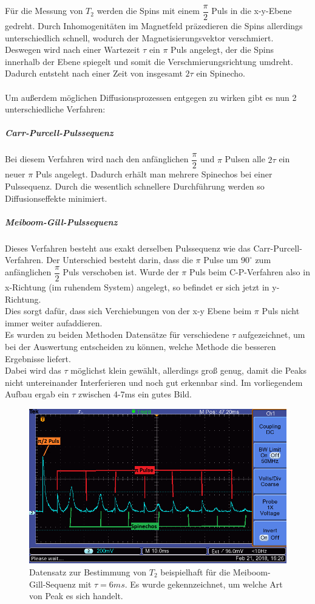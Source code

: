 \documentclass[12pt,a4paper]{article}
\begin{document}
Für die Messung von $T_2$ werden die Spins mit einem  $\dfrac{\pi}{2}$ Puls in die x-y-Ebene gedreht. Durch Inhomogenitäten im Magnetfeld präzedieren die Spins allerdings unterschiedlich schnell, wodurch der Magnetisierungsvektor verschmiert. Deswegen wird nach einer Wartezeit $\tau$ ein $\pi$ Puls angelegt, der die Spins innerhalb der Ebene spiegelt und somit die Verschmierungsrichtung umdreht. Dadurch entsteht nach einer Zeit von insgesamt $2 \tau$ ein Spinecho. \\ 
\\
Um außerdem möglichen Diffusionsprozessen entgegen zu wirken gibt es nun 2 unterschiedliche Verfahren:

\subparagraph{Carr-Purcell-Pulssequenz}
Bei diesem Verfahren wird nach den anfänglichen $\dfrac{\pi}{2}$ und $\pi$ Pulsen alle  $2 \tau$ ein neuer $\pi$ Puls angelegt. Dadurch erhält man mehrere Spinechos bei einer Pulssequenz. Durch die wesentlich schnellere Durchführung werden so Diffusionseffekte minimiert.
\subparagraph{Meiboom-Gill-Pulssequenz}
Dieses Verfahren besteht aus exakt derselben Pulssequenz wie das Carr-Purcell-Verfahren. Der  Unterschied besteht darin, dass  die $\pi$ Pulse um $90^{\circ}$ zum anfänglichen $\dfrac{\pi}{2}$ Puls verschoben ist. Wurde der $\pi$ Puls beim C-P-Verfahren also in x-Richtung (im ruhendem System) angelegt, so befindet er sich jetzt in y-Richtung.\\
Dies sorgt dafür, dass sich Verchiebungen von der x-y Ebene beim $\pi$ Puls nicht immer weiter aufaddieren.
\\
Es wurden zu beiden Methoden Datensätze für verschiedene $\tau$ aufgezeichnet, um bei der Auswertung entscheiden zu können, welche Methode die besseren Ergebnisse liefert.\\
Dabei wird das $\tau$ möglichst klein gewählt, allerdings groß genug, damit die Peaks nicht untereinander Interferieren und noch gut erkennbar sind. Im vorliegendem Aufbau ergab ein $\tau$ zwischen 4-7ms ein gutes Bild.\\

\begin{figure}
\centering
\includegraphics[scale=0.8]{Bilder/T2Beispiel.png}
\caption{Datensatz zur Bestimmung von $T_2$ beispielhaft für die Meiboom-Gill-Sequenz mit $\tau = 6ms$. Es wurde gekennzeichnet, um welche Art von Peak es sich handelt. }
\label{fig:T2Beispiel}
\end{figure}
\end{document}

